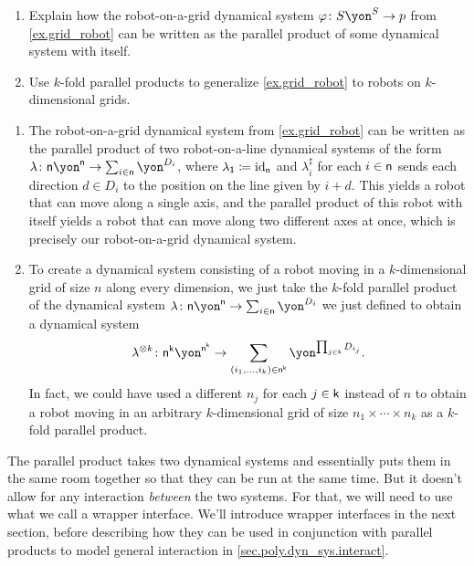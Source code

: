 \documentclass[Book-Poly]{subfiles}
\begin{document}
\begin{exercise} \label{exc.grid_robot_par}
\begin{enumerate}
    \item Explain how the robot-on-a-grid dynamical system $\varphi\colon S\yon^S\to p$ from \cref{ex.grid_robot} can be written as the parallel product of some dynamical system with itself.
    \item Use $k$-fold parallel products to generalize \cref{ex.grid_robot} to robots on $k$-dimensional grids.\qedhere
\end{enumerate}
\begin{solution}
\begin{enumerate}
    \item The robot-on-a-grid dynamical system from \cref{ex.grid_robot} can be written as the parallel product of two robot-on-a-line dynamical systems of the form $\lambda\colon\ord{n}\yon^{\ord{n}}\to\sum_{i\in\ord{n}}\yon^{D_i}$, where $\lambda_{\textsf{1}}\coloneqq\mathrm{id}_{\mathsf{n}}$ and $\lambda^\sharp_i$ for each $i\in\mathsf{n}$ sends each direction $d\in D_i$ to the position on the line given by $i+d$.
    This yields a robot that can move along a single axis, and the parallel product of this robot with itself yields a robot that can move along two different axes at once, which is precisely our robot-on-a-grid dynamical system.
    \item To create a dynamical system consisting of a robot moving in a $k$-dimensional grid of size $n$ along every dimension, we just take the $k$-fold parallel product of the dynamical system $\lambda\colon\ord{n}\yon^{\ord{n}}\to\sum_{i\in\ord{n}}\yon^{D_i}$ we just defined to obtain a dynamical system \[\lambda^{\otimes k}\colon\ord{n}^\ord{k}\yon^{\ord{n}^\ord{k}}\to\sum_{(i_1,\ldots,i_k)\in\ord{n}^\ord{k}}\yon^{\prod_{j\in\ord{k}}D_{i_j}}.\]
    In fact, we could have used a different $n_j$ for each $j\in\mathsf{k}$ instead of $n$ to obtain a robot moving in an arbitrary $k$-dimensional grid of size $n_1\times\cdots\times n_k$ as a $k$-fold parallel product.
\end{enumerate}
\end{solution}
\end{exercise}

The parallel product takes two dynamical systems and essentially puts them in the same room together so that they can be run at the same time.
But it doesn't allow for any interaction \emph{between} the two systems.
For that, we will need to use what we call a wrapper interface.
We'll introduce wrapper interfaces in the next section, before describing how they can be used in conjunction with parallel products to model general interaction in \cref{sec.poly.dyn_sys.interact}.
\end{document}

